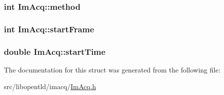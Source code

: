 \label{struct_im_acq_a0afeeee09d54a896433376cf359d209f}
\hypertarget{struct_im_acq_a338a470fffa65fbfb9fade98a8fc12ca}{
\subsubsection[{method}]{\setlength{\rightskip}{0pt plus 5cm}int {\bf ImAcq::method}}}
\label{struct_im_acq_a338a470fffa65fbfb9fade98a8fc12ca}
\hypertarget{struct_im_acq_a1f52cf31c1f19f27846d481654a370e2}{
\subsubsection[{startFrame}]{\setlength{\rightskip}{0pt plus 5cm}int {\bf ImAcq::startFrame}}}
\label{struct_im_acq_a1f52cf31c1f19f27846d481654a370e2}
\hypertarget{struct_im_acq_a6a4ccba3d36d599a7902a943f1f6a08c}{
\subsubsection[{startTime}]{\setlength{\rightskip}{0pt plus 5cm}double {\bf ImAcq::startTime}}}
\label{struct_im_acq_a6a4ccba3d36d599a7902a943f1f6a08c}


The documentation for this struct was generated from the following file:\begin{DoxyCompactItemize}
\item 
src/libopentld/imacq/\hyperlink{_im_acq_8h}{ImAcq.h}\end{DoxyCompactItemize}
